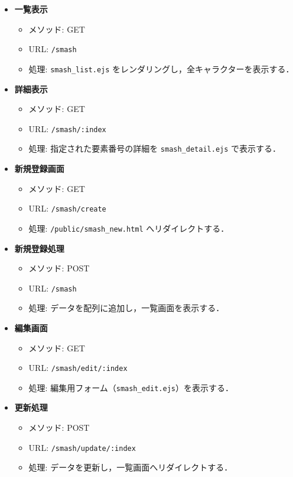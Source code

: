 \documentclass[uplatex,dvipdfmx]{jsarticle}
\begin{document}
\begin{itemize}
    \item \textbf{一覧表示}
    \begin{itemize}
        \item メソッド: GET
        \item URL: \texttt{/smash}
        \item 処理: \texttt{smash\_list.ejs} をレンダリングし，全キャラクターを表示する．
    \end{itemize}

    \item \textbf{詳細表示}
    \begin{itemize}
        \item メソッド: GET
        \item URL: \texttt{/smash/:index}
        \item 処理: 指定された要素番号の詳細を \texttt{smash\_detail.ejs} で表示する．
    \end{itemize}
    
    \item \textbf{新規登録画面}
    \begin{itemize}
        \item メソッド: GET
        \item URL: \texttt{/smash/create}
        \item 処理: \texttt{/public/smash\_new.html} へリダイレクトする．
    \end{itemize}

    \item \textbf{新規登録処理}
    \begin{itemize}
        \item メソッド: POST
        \item URL: \texttt{/smash}
        \item 処理: データを配列に追加し，一覧画面を表示する．
    \end{itemize}

    \item \textbf{編集画面}
    \begin{itemize}
        \item メソッド: GET
        \item URL: \texttt{/smash/edit/:index}
        \item 処理: 編集用フォーム（\texttt{smash\_edit.ejs}）を表示する．
    \end{itemize}

    \item \textbf{更新処理}
    \begin{itemize}
        \item メソッド: POST
        \item URL: \texttt{/smash/update/:index}
        \item 処理: データを更新し，一覧画面へリダイレクトする．
    \end{itemize}


\end{itemize}
\end{document}

